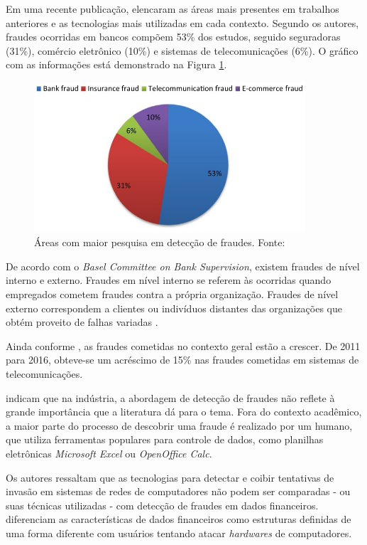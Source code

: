 \documentclass[smallextended]{svjour3}
\begin{document}
Em uma recente publicação, \cite{Abdallah2016} elencaram as áreas mais presentes em trabalhos anteriores e as tecnologias mais utilizadas em cada contexto. Segundo os autores, fraudes ocorridas em bancos compõem 53\% dos estudos, seguido seguradoras (31\%), comércio eletrônico (10\%) e sistemas de telecomunicações (6\%). O gráfico com as informações está demonstrado na Figura \ref{fig:fraudespopulares}. 

\begin{figure}[!ht]
	\centering
	\includegraphics[width=0.9\textwidth]{imagens/fraudespopulares.jpg}
	\caption{Áreas com maior pesquisa em detecção de fraudes. Fonte: \cite{Abdallah2016}}
	\label{fig:fraudespopulares}
\end{figure}

De acordo com o \emph{Basel Committee on Bank Supervision}, existem fraudes de nível interno e externo. Fraudes em nível interno se referem às ocorridas quando empregados cometem fraudes contra a própria organização. Fraudes de nível externo correspondem a clientes ou indivíduos distantes das organizações que obtém proveito de falhas variadas \citep{Abdallah2016}.

Ainda conforme \cite{Abdallah2016}, as fraudes cometidas no contexto geral estão a crescer. De 2011 para 2016, obteve-se um acréscimo de 15\% nas fraudes cometidas em sistemas de telecomunicações.

\cite{Flegel2010} indicam que na indústria, a abordagem de detecção de fraudes não reflete à grande importância que a literatura dá para o tema. Fora do contexto acadêmico, a maior parte do processo de descobrir uma fraude é realizado por um humano, que utiliza ferramentas populares para controle de dados, como planilhas eletrônicas \emph{Microsoft Excel} ou \emph{OpenOffice Calc}. 

Os autores ressaltam que as tecnologias para detectar e coibir tentativas de invasão em sistemas de redes de computadores não podem ser comparadas - ou suas técnicas utilizadas - com detecção de fraudes em dados financeiros. \cite{Flegel2010} diferenciam as características de dados financeiros como estruturas definidas de uma forma diferente com usuários tentando atacar \emph{hardwares} de computadores.
\end{document}
